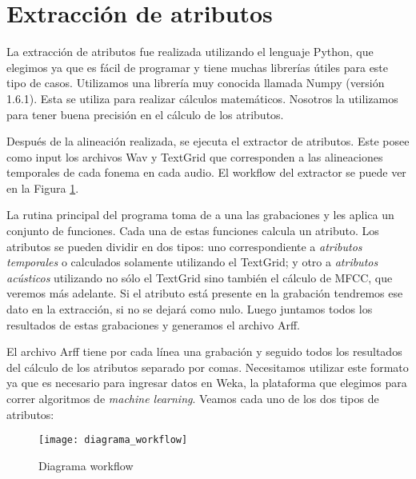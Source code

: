
\section{Extracción de atributos}

La extracción de atributos fue realizada utilizando el lenguaje Python, que elegimos ya que es fácil de programar y tiene muchas librerías útiles para este tipo de casos. Utilizamos una librería muy conocida llamada Numpy (versión 1.6.1). Esta se utiliza para realizar cálculos matemáticos. Nosotros la utilizamos para tener buena precisión en el cálculo de los atributos.

Después de la alineación realizada, se ejecuta el extractor de atributos. Este posee como input los archivos Wav y TextGrid que corresponden a las alineaciones temporales de cada fonema en cada audio. El workflow del extractor se puede ver en la Figura \ref{workflow}. 

La rutina principal del programa toma de a una las grabaciones y les aplica un conjunto de funciones. Cada una de estas funciones calcula un atributo. Los atributos se pueden dividir en dos tipos: uno correspondiente a \textit{atributos temporales} o calculados solamente utilizando el TextGrid; y otro a \textit{atributos acústicos} utilizando no sólo el TextGrid sino también el cálculo de MFCC, que veremos más adelante. Si el atributo está presente en la grabación tendremos ese dato en la extracción, si no se dejará como nulo. Luego juntamos todos los resultados de estas grabaciones y generamos el archivo Arff.

El archivo Arff  tiene por cada línea una grabación y seguido todos los resultados del cálculo de los atributos separado por comas. Necesitamos utilizar este formato ya que es necesario para ingresar datos en Weka, la plataforma que elegimos para correr algoritmos de \textit{machine learning}. Veamos cada uno de los dos tipos de atributos:

\begin{figure}[h!]
    \centerline{\texttt{[image: diagrama\_workflow]} }
    \caption{Diagrama workflow}
    \label{workflow}
\end{figure}

